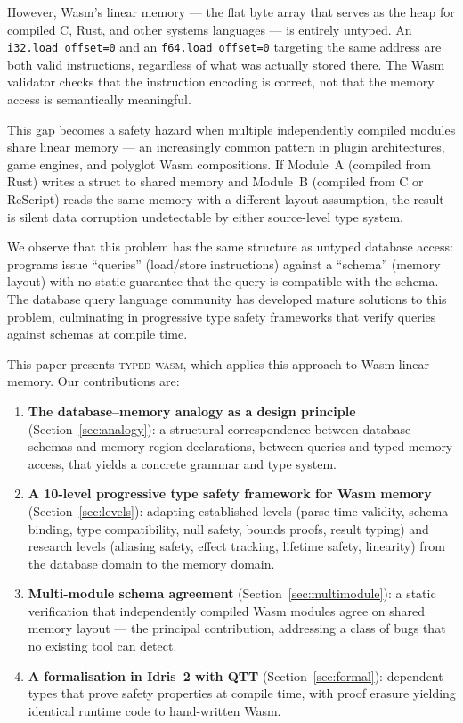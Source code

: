 \documentclass[11pt,a4paper]{article}
\newcommand{\typedwasm}{\textsc{typed-wasm}}
\begin{document}
However, Wasm's linear memory --- the flat byte array that serves as the
heap for compiled C, Rust, and other systems languages --- is entirely
untyped.  An \lstinline{i32.load offset=0} and an
\lstinline{f64.load offset=0} targeting the same address are both valid
instructions, regardless of what was actually stored there.  The Wasm
validator checks that the instruction encoding is correct, not that the
memory access is semantically meaningful.

This gap becomes a safety hazard when multiple independently compiled
modules share linear memory --- an increasingly common pattern in plugin
architectures, game engines, and polyglot Wasm compositions.  If Module~A
(compiled from Rust) writes a struct to shared memory and Module~B
(compiled from C or ReScript) reads the same memory with a different
layout assumption, the result is silent data corruption undetectable by
either source-level type system.

We observe that this problem has the same structure as untyped database
access: programs issue ``queries'' (load/store instructions) against a
``schema'' (memory layout) with no static guarantee that the query is
compatible with the schema.  The database query language community has
developed mature solutions to this problem, culminating in progressive
type safety frameworks that verify queries against schemas at compile time.

This paper presents \typedwasm{}, which applies this approach to Wasm
linear memory.  Our contributions are:

\begin{enumerate}
  \item \textbf{The database--memory analogy as a design principle}
    (Section~\ref{sec:analogy}): a structural correspondence between
    database schemas and memory region declarations, between queries and
    typed memory access, that yields a concrete grammar and type system.

  \item \textbf{A 10-level progressive type safety framework for Wasm
    memory} (Section~\ref{sec:levels}): adapting established levels
    (parse-time validity, schema binding, type compatibility, null
    safety, bounds proofs, result typing) and research levels (aliasing
    safety, effect tracking, lifetime safety, linearity) from the
    database domain to the memory domain.

  \item \textbf{Multi-module schema agreement}
    (Section~\ref{sec:multimodule}): a static verification that
    independently compiled Wasm modules agree on shared memory layout ---
    the principal contribution, addressing a class of bugs that no
    existing tool can detect.

  \item \textbf{A formalisation in Idris~2 with QTT}
    (Section~\ref{sec:formal}): dependent types that prove safety
    properties at compile time, with proof erasure yielding identical
    runtime code to hand-written Wasm.
\end{enumerate}
\end{document}
